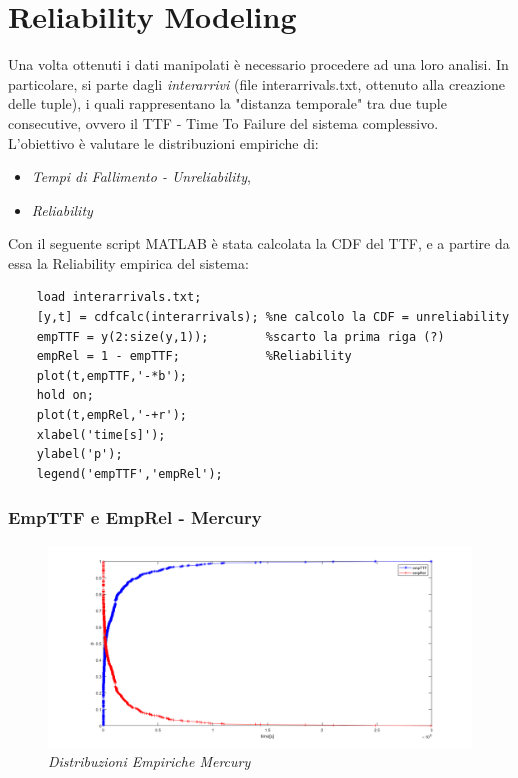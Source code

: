 \section{Reliability Modeling}
Una volta ottenuti i dati manipolati è necessario procedere ad una loro analisi. In particolare, si parte dagli \textit{interarrivi} (file interarrivals.txt, ottenuto alla creazione delle tuple), i quali rappresentano la "distanza temporale" tra due tuple consecutive, ovvero il TTF - Time To Failure del sistema complessivo. 
\\L'obiettivo è valutare le distribuzioni empiriche di:
\begin{itemize}
	\item \textit{Tempi di Fallimento - Unreliability},
	\item \textit{Reliability}
\end{itemize}
Con il seguente script MATLAB è stata calcolata la CDF del TTF, e a partire da essa la Reliability empirica del sistema:
\begin{verbatim}
	load interarrivals.txt;         
	[y,t] = cdfcalc(interarrivals); %ne calcolo la CDF = unreliability
	empTTF = y(2:size(y,1));        %scarto la prima riga (?)
	empRel = 1 - empTTF;            %Reliability
	plot(t,empTTF,'-*b');
	hold on;
	plot(t,empRel,'-+r');
	xlabel('time[s]');
	ylabel('p');
	legend('empTTF','empRel');
\end{verbatim}
\subsubsection{EmpTTF e EmpRel - Mercury}
\begin{figure}[H]
	\centering
	\includegraphics[width=\textwidth]{img/hw6/TTF_Mercury.png}
	\caption{\textit{Distribuzioni Empiriche Mercury}}
\end{figure}

